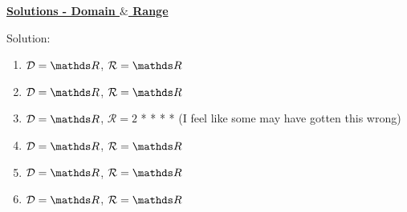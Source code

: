 \documentclass[12pt]{article} %
\begin{document}
	\renewcommand*{\coursecode}{MATH 235} %
	\renewcommand*{\assgnnumber}{Assignment 1} %
	\renewcommand*{\submdate}{September 14, 2021} %
	\renewcommand*{\studentfname}{Abdullah} %
	\renewcommand*{\studentlname}{Zubair} %
    \renewcommand*{\proofname}{Proof:}

	\renewcommand\qedsymbol{$\blacksquare$}
	\setfigpath
	\fancyhfoffset[L,O]{0pt} %




\begin{center}
  \textbf{\underline{\Huge{Solutions - Domain $\&$ Range}}}
\end{center}
\begin{qstn} Solution:  
    \begin{enumerate}[label=(\alph*)]
      \item $\mathcal{D} = \R$, $\mathcal{R} = \R$
      \item $\mathcal{D} = \R$, $\mathcal{R} = \R$
      \item $\mathcal{D} = \R$, $\mathcal{R} = 2$ * * *   *  (I feel like some may have gotten this wrong)
      \item $\mathcal{D} = \R$, $\mathcal{R} = \R$
      \item $\mathcal{D} = \R$, $\mathcal{R} = \R$
      \item $\mathcal{D} = \R$, $\mathcal{R} = \R$
    \end{enumerate}
\end{qstn}
\end{document}
